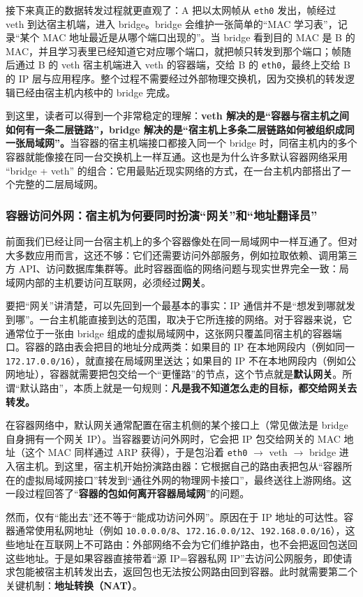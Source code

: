 接下来真正的数据转发过程就更直观了：A 把以太网帧从 \texttt{eth0} 发出，帧经过 veth 到达宿主机端，进入 bridge。bridge 会维护一张简单的“MAC 学习表”，记录“某个 MAC 地址最近是从哪个端口出现的”。当 bridge 看到目的 MAC 是 B 的 MAC，并且学习表里已经知道它对应哪个端口，就把帧只转发到那个端口；帧随后通过 B 的 veth 宿主机端进入 veth 的容器端，交给 B 的 \texttt{eth0}，最终上交给 B 的 IP 层与应用程序。整个过程不需要经过外部物理交换机，因为交换机的转发逻辑已经由宿主机内核中的 bridge 完成。

到这里，读者可以得到一个非常稳定的理解：\textbf{veth 解决的是“容器与宿主机之间如何有一条二层链路”，bridge 解决的是“宿主机上多条二层链路如何被组织成同一张局域网”。}当容器的宿主机端接口都接入同一个 bridge 时，同宿主机内的多个容器就能像接在同一台交换机上一样互通。这也是为什么许多默认容器网络采用 “bridge + veth” 的组合：它用最贴近现实网络的方式，在一台主机内部搭出了一个完整的二层局域网。


\subsubsection{容器访问外网：宿主机为何要同时扮演“网关”和“地址翻译员”}

前面我们已经让同一台宿主机上的多个容器像处在同一局域网中一样互通了。但对大多数应用而言，这还不够：它们还需要访问外部服务，例如拉取依赖、调用第三方 API、访问数据库集群等。此时容器面临的网络问题与现实世界完全一致：局域网内部的主机要访问互联网，必须经过\textbf{网关}。

要把“网关”讲清楚，可以先回到一个最基本的事实：IP 通信并不是“想发到哪就发到哪”。一台主机能直接到达的范围，取决于它所连接的网络。对于容器来说，它通常位于一张由 bridge 组成的虚拟局域网中，这张网只覆盖同宿主机的容器端口。容器的路由表会把目的地址分成两类：如果目的 IP 在本地网段内（例如同一 \texttt{172.17.0.0/16}），就直接在局域网里送达；如果目的 IP 不在本地网段内（例如公网地址），容器就需要把包交给一个“更懂路”的节点，这个节点就是\textbf{默认网关}。所谓“默认路由”，本质上就是一句规则：\textbf{凡是我不知道怎么走的目标，都交给网关去转发。}

在容器网络中，默认网关通常配置在宿主机侧的某个接口上（常见做法是 bridge 自身拥有一个网关 IP）。当容器要访问外网时，它会把 IP 包交给网关的 MAC 地址（这个 MAC 同样通过 ARP 获得），于是包沿着 \texttt{eth0} $\rightarrow$ veth $\rightarrow$ bridge 进入宿主机。到这里，宿主机开始扮演路由器：它根据自己的路由表把包从“容器所在的虚拟局域网接口”转发到“通往外网的物理网卡接口”，最终送往上游网络。这一段过程回答了“\textbf{容器的包如何离开容器局域网}”的问题。

然而，仅有“能出去”还不等于“能成功访问外网”。原因在于 IP 地址的可达性。容器通常使用私网地址（例如 \texttt{10.0.0.0/8}、\texttt{172.16.0.0/12}、\texttt{192.168.0.0/16}），这些地址在互联网上不可路由：外部网络不会为它们维护路由，也不会把返回包送回这些地址。于是如果容器直接带着“源 IP=容器私网 IP”去访问公网服务，即使请求包能被宿主机转发出去，返回包也无法按公网路由回到容器。此时就需要第二个关键机制：\textbf{地址转换（NAT）}。

